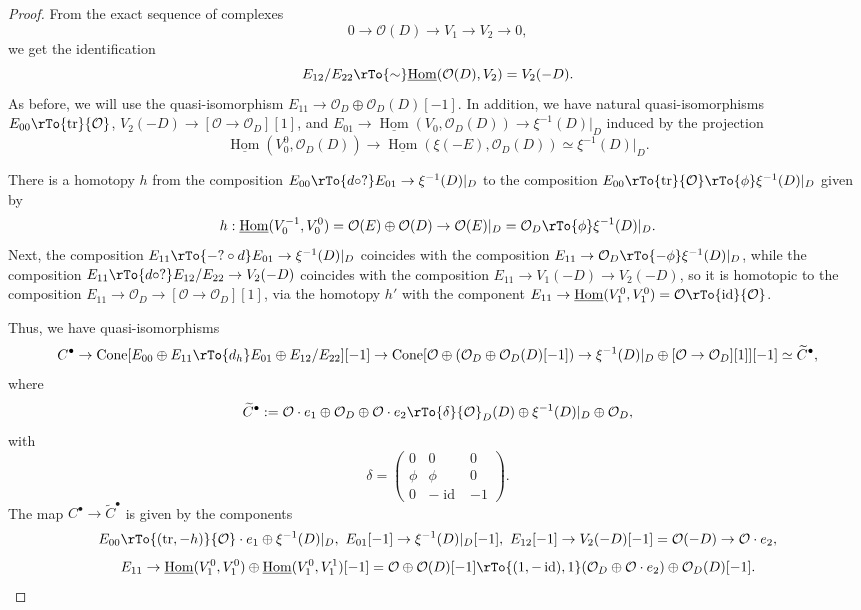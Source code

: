 \documentclass[reqno]{amsart}
\theoremstyle{definition}
\theoremstyle{remark}
\newcommand{\wt}{\widetilde}
\newcommand{\und}{\underline}
\newcommand{\Hom}{\operatorname{Hom}}
\newcommand{\OO}{{\mathcal O}}
\newcommand{\de}{\delta}
\newcommand{\tr}{\operatorname{tr}}
\newcommand{\id}{\operatorname{id}}
\newcommand{\Cone}{\operatorname{Cone}}
\numberwithin{equation}{section}
\begin{document}
\begin{proof}
From the exact sequence of complexes
$$0\to \OO(D)\to V_1\to V_2\to 0,$$ 
we get the identification
$$E_{12}/E_{22}\rTo{\sim} \und{\Hom}(\OO(D),V_2)=V_2(-D).$$
As before, we will use the quasi-isomorphism $E_{11}\to \OO_D\oplus\OO_D(D)[-1]$. In addition,
we have natural quasi-isomorphisms $E_{00}\rTo{\tr}\OO$, $V_2(-D)\to [\OO\to \OO_D][1]$, and $E_{01}\to \und{\Hom}(V_0,\OO_D(D))\to \xi^{-1}(D)|_D$
induced by the projection 
$$\und{\Hom}(V_0^0,\OO_D(D))\to \und{\Hom}(\xi(-E),\OO_D(D))\simeq \xi^{-1}(D)|_D.$$ 

There is a homotopy $h$ from the composition $E_{00}\rTo{d\circ?} E_{01}\to \xi^{-1}(D)|_D$ to the composition $E_{00}\rTo{\tr}\OO\rTo{\phi} \xi^{-1}(D)|_D$ 
given by 
$$h:\und{\Hom}(V_0^{-1},V_0^0)=\OO(E)\oplus \OO(D)\to \OO(E)|_D=\OO_D\rTo{\phi} \xi^{-1}(D)|_D.$$
Next, the composition $E_{11}\rTo{-?\circ d} E_{01}\to \xi^{-1}(D)|_D$ coincides with the composition $E_{11}\to \OO_D\rTo{-\phi}\xi^{-1}(D)|_D$,
while the composition $E_{11}\rTo{d\circ ?} E_{12}/E_{22}\to V_2(-D)$ coincides with the composition $E_{11}\to V_1(-D)\to V_2(-D)$, so it
is homotopic to the composition $E_{11}\to \OO_D\to [\OO\to \OO_D][1]$, via the homotopy $h'$ with the component $E_{11}\to \und{\Hom}(V_1^0,V_1^0)=\OO\rTo{\id}\OO$.


Thus, we have quasi-isomorphisms
$$C^\bullet\to \Cone[E_{00}\oplus E_{11}\rTo{d_h} E_{01}\oplus E_{12}/E_{22}][-1] \to
\Cone[\OO\oplus (\OO_D\oplus \OO_D(D)[-1])\to \xi^{-1}(D)|_D\oplus [\OO\to\OO_D][1]][-1]\simeq \wt{C}^\bullet,$$
where
$$\wt{C}^\bullet:=\OO\cdot e_1\oplus \OO_D\oplus \OO\cdot e_2\rTo{\de}  \OO_D(D)\oplus \xi^{-1}(D)|_D\oplus \OO_D,$$
with 
$$\de=\left(\begin{matrix} 0 & 0 & 0 \\ \phi & \phi & 0 \\ 0 & -\id & -1 \end{matrix}\right).$$
The map $C^\bullet\to \wt{C}^\bullet$ is given by the components 
$$E_{00}\rTo{(\tr,-h)} \OO\cdot e_1\oplus \xi^{-1}(D)|_D, \ E_{01}[-1]\to \xi^{-1}(D)|_D[-1], \ E_{12}[-1]\to V_2(-D)[-1]=\OO(-D)\to \OO\cdot e_2,$$
$$E_{11}\to \und{\Hom}(V_1^0,V_1^0)\oplus \und{\Hom}(V_1^0,V_1^1)[-1]=\OO\oplus \OO(D)[-1]\rTo{(1,-\id),1} (\OO_D\oplus \OO\cdot e_2)\oplus \OO_D(D)[-1].$$


\end{proof}
\end{document}
